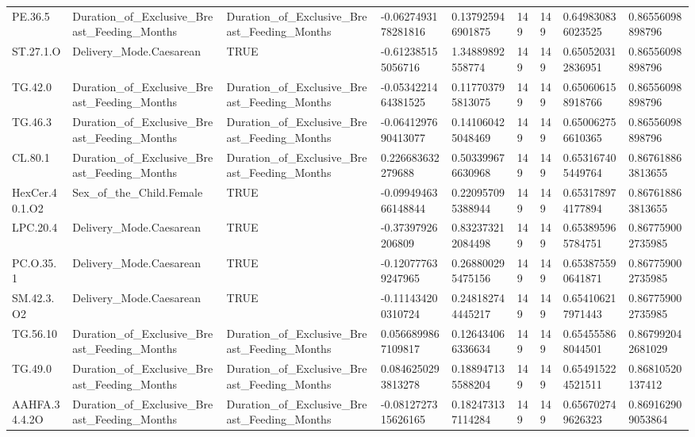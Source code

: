 \begin{longtable}{lllllllll}
PE.36.5 & Duration\_of\_Exclusive\_Breast\_Feeding\_Months & Duration\_of\_Exclusive\_Breast\_Feeding\_Months & -0.0627493178281816 & 0.137925946901875 & 149 & 149 & 0.649830836023525 & 0.86556098898796 \\
ST.27.1.O & Delivery\_Mode.Caesarean & TRUE & -0.612385155056716 & 1.34889892558774 & 149 & 149 & 0.650520312836951 & 0.86556098898796 \\
TG.42.0 & Duration\_of\_Exclusive\_Breast\_Feeding\_Months & Duration\_of\_Exclusive\_Breast\_Feeding\_Months & -0.0534221464381525 & 0.117703795813075 & 149 & 149 & 0.650606158918766 & 0.86556098898796 \\
TG.46.3 & Duration\_of\_Exclusive\_Breast\_Feeding\_Months & Duration\_of\_Exclusive\_Breast\_Feeding\_Months & -0.0641297690413077 & 0.141060425048469 & 149 & 149 & 0.650062756610365 & 0.86556098898796 \\
CL.80.1 & Duration\_of\_Exclusive\_Breast\_Feeding\_Months & Duration\_of\_Exclusive\_Breast\_Feeding\_Months & 0.226683632279688 & 0.503399676630968 & 149 & 149 & 0.653167405449764 & 0.867618863813655 \\
HexCer.40.1.O2 & Sex\_of\_the\_Child.Female & TRUE & -0.0994946366148844 & 0.220957095388944 & 149 & 149 & 0.653178974177894 & 0.867618863813655 \\
LPC.20.4 & Delivery\_Mode.Caesarean & TRUE & -0.37397926206809 & 0.832373212084498 & 149 & 149 & 0.653895965784751 & 0.867759002735985 \\
PC.O.35.1 & Delivery\_Mode.Caesarean & TRUE & -0.120777639247965 & 0.268800295475156 & 149 & 149 & 0.653875590641871 & 0.867759002735985 \\
SM.42.3.O2 & Delivery\_Mode.Caesarean & TRUE & -0.111434200310724 & 0.248182744445217 & 149 & 149 & 0.654106217971443 & 0.867759002735985 \\
TG.56.10 & Duration\_of\_Exclusive\_Breast\_Feeding\_Months & Duration\_of\_Exclusive\_Breast\_Feeding\_Months & 0.0566899867109817 & 0.126434066336634 & 149 & 149 & 0.654555868044501 & 0.867992042681029 \\
TG.49.0 & Duration\_of\_Exclusive\_Breast\_Feeding\_Months & Duration\_of\_Exclusive\_Breast\_Feeding\_Months & 0.0846250293813278 & 0.188947135588204 & 149 & 149 & 0.654915224521511 & 0.86810520137412 \\
AAHFA.34.4.2O & Duration\_of\_Exclusive\_Breast\_Feeding\_Months & Duration\_of\_Exclusive\_Breast\_Feeding\_Months & -0.0812727315626165 & 0.182473137114284 & 149 & 149 & 0.656702749626323 & 0.869162909053864 \\

\end{longtable}
